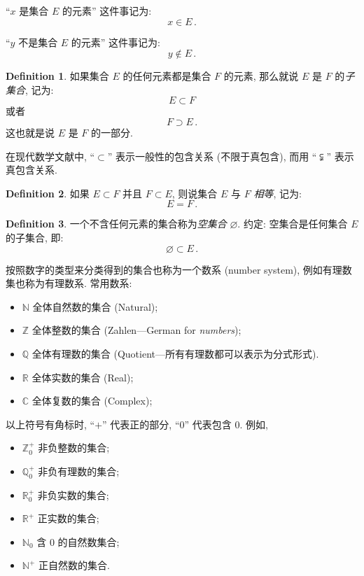 \documentclass{book}
\renewcommand{\emptyset}{\varnothing}
\newcommand{\R}{\mathbb{R}}
\newcommand{\N}{\mathbb{N}}
\numberwithin{equation}{section}
\numberwithin{figure}{section}
\theoremstyle{definition}
\newtheorem{definition}{Definition}
\newcommand{\dq}[1]{``#1''}
\begin{document}
\dq{$x$ 是集合 $E$ 的元素} 这件事记为:
\begin{equation*}
  x\in E\,.
\end{equation*}

\dq{$y$ 不是集合 $E$ 的元素} 这件事记为:
\begin{equation*}
  y\not\in E\,.
\end{equation*}

\begin{definition}
  如果集合 $E$ 的任何元素都是集合 $F$ 的元素, 那么就说 $E$ 是 $F$ 的\emph{子集合}, 记为:
\begin{equation*}
  E\subset F
\end{equation*}
或者
\begin{equation*}
  F\supset E\,.
\end{equation*}
这也就是说 $E$ 是 $F$ 的一部分.
\end{definition}

在现代数学文献中, \dq{$\subset$} 表示一般性的包含关系 (不限于真包含), 而用 \dq{$\subsetneqq$} 表示真包含关系.

\begin{definition}
  如果 $E\subset F$ 并且 $F\subset E$, 则说集合 $E$ 与 $F$ \emph{相等}, 记为:
  \begin{equation*}
    E=F\,.
  \end{equation*}
\end{definition}

\begin{definition}
  一个不含任何元素的集合称为\emph{空集合} $\emptyset$. 约定: 空集合是任何集合 $E$ 的子集合, 即:
  \begin{equation*}
    \emptyset\subset E\,.
  \end{equation*}
\end{definition}

按照数字的类型来分类得到的集合也称为一个数系 (number system), 例如有理数集也称为有理数系.
常用数系:
\begin{itemize}
  \item $\mathbb{N}$ 全体自然数的集合 (Natural);
  \item $\mathbb{Z}$ 全体整数的集合 (Zahlen---German for \emph{numbers});
  \item $\mathbb{Q}$ 全体有理数的集合 (Quotient---所有有理数都可以表示为分式形式).
  \item $\mathbb{R}$ 全体实数的集合 (Real);
  \item $\mathbb{C}$ 全体复数的集合 (Complex);
\end{itemize}
以上符号有角标时, \dq{$+$} 代表正的部分, \dq{0} 代表包含 0. 例如,
\begin{itemize}
  \item $\mathbb{Z}_0^+$ 非负整数的集合;
  \item $\mathbb{Q}_0^+$ 非负有理数的集合;
  \item $\mathbb{R}_0^+$ 非负实数的集合;
  \item $\R^+$ 正实数的集合;
  \item $\N_0$ 含 0 的自然数集合;
  \item $\N^+$ 正自然数的集合.
\end{itemize}
\end{document}
